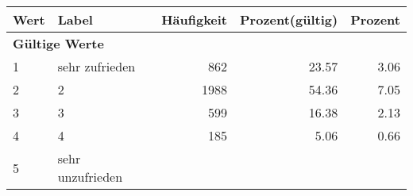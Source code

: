     \begin{longtable}{lXrrr}
     \toprule
     \textbf{Wert} & \textbf{Label} & \textbf{Häufigkeit} & \textbf{Prozent(gültig)} & \textbf{Prozent} \\
     \endhead
     \midrule
     \multicolumn{5}{l}{\textbf{Gültige Werte}}\\

     1 &
     \multicolumn{1}{X}{ sehr zufrieden   } &


       \num{862} &
       \num[round-mode=places,round-precision=2]{23,57} &
         \num[round-mode=places,round-precision=2]{3,06} \\

     2 &
     \multicolumn{1}{X}{ 2   } &


       \num{1988} &
       \num[round-mode=places,round-precision=2]{54,36} &
         \num[round-mode=places,round-precision=2]{7,05} \\

     3 &
     \multicolumn{1}{X}{ 3   } &


       \num{599} &
       \num[round-mode=places,round-precision=2]{16,38} &
         \num[round-mode=places,round-precision=2]{2,13} \\

     4 &
     \multicolumn{1}{X}{ 4   } &


       \num{185} &
       \num[round-mode=places,round-precision=2]{5,06} &
         \num[round-mode=places,round-precision=2]{0,66} \\

     5 &
     \multicolumn{1}{X}{ sehr unzufrieden   } &



\end{longtable}
